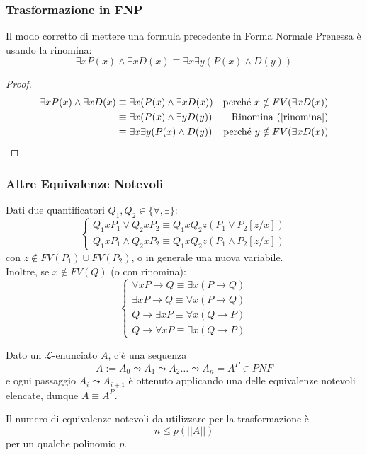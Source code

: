 \subsubsection{Trasformazione in FNP}
Il modo corretto di mettere una formula precedente in Forma Normale Prenessa è usando la rinomina:
$$
\exists x P(x) \land \exists x D(x) \equiv \exists x \exists y (P(x) \land D(y))
$$
\begin{proof}
\begin{align*}
  \exists x P(x) \land \exists x D(x) & \equiv \exists x (P(x) \land \exists x D(x)) & \text{perché } x \notin FV(\exists x D(x)) \\
  & \equiv \exists x (P(x) \land \exists y D(y)) & \text{Rinomina~(\ref{rinomina})} \\
  & \equiv \exists x \exists y (P(x) \land D(y)) & \text{perché } y \notin FV(\exists x D(x)) \\
\end{align*}
\end{proof}

\subsubsection{Altre Equivalenze Notevoli}
Dati due quantificatori $Q_1, Q_2 \in \{\forall, \exists\}$:
\[
\begin{cases}
  Q_1 x P_1 \lor Q_2 x P_2 \equiv Q_1 x Q_2 z (P_1 \lor P_2[z/x]) \\
  Q_1 x P_1 \land Q_2 x P_2 \equiv Q_1 x Q_2 z (P_1 \land P_2[z/x])
\end{cases}
\]
con $z \notin FV(P_1) \cup FV(P_2)$, o in generale una nuova variabile. \\
Inoltre, se $x \notin FV(Q)$ (o con rinomina): 
$$
\begin{cases}
  \forall x P \rightarrow Q \equiv \exists x (P \rightarrow Q) \\
  \exists x P \rightarrow Q \equiv \forall x (P \rightarrow Q) \\
  Q \rightarrow \exists x P  \equiv \forall  x (Q \rightarrow P) \\
  Q \rightarrow \forall x P  \equiv \exists x (Q \rightarrow P)
\end{cases}
$$

\noindent
Dato un $\mathscr{L}$-enunciato $A$, c'è una sequenza
$$
A := A_0 \leadsto A_1 \leadsto A_2 \ldots \leadsto A_n = A^P \in PNF
$$
e ogni passaggio  $A_i \leadsto A_{i+1}$ è ottenuto applicando una delle equivalenze 
notevoli elencate, dunque $A \equiv A^P$. 
\begin{oss}
        Il numero di equivalenze notevoli da utilizzare per la trasformazione è 
        $$
        n \leq p(||A||)
        $$
        per un qualche polinomio $p$. 
\end{oss}

